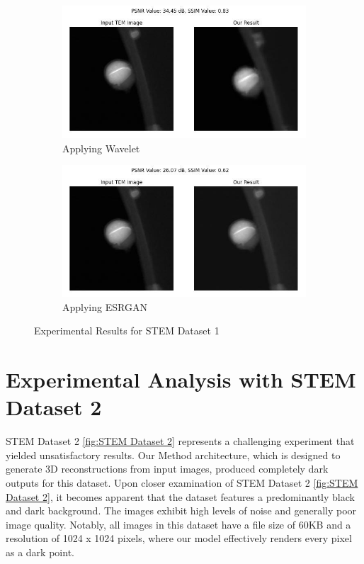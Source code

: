 \begin{figure}[H]
    \begin{subfigure}{.47\textwidth} %
        \includegraphics[width=\textwidth]{img/Results/STEM dataset 1/STEM_Data_1_wavelet.jpg}
        \caption{Applying Wavelet}
        \label{fig:STEM_Dataset_1_Results_Image5}
    \end{subfigure}
    \hfill
    \begin{subfigure}{.47\textwidth} %
        \includegraphics[width=\textwidth]{img/Results/STEM dataset 1/STEM_Data_1_ESRGAN.jpg}
        \caption{Applying ESRGAN}
        \label{fig:Image5}
    \end{subfigure}
    \caption{Experimental Results for STEM Dataset 1}
    \label{fig:STEM_Dataset_1_Results}
\end{figure}

\clearpage
\section{Experimental Analysis with STEM Dataset 2}
STEM Dataset 2 \ref{fig:STEM Dataset 2} represents a challenging experiment that yielded unsatisfactory results. Our Method architecture, which is designed to generate 3D reconstructions from input images, produced completely dark outputs for this dataset. Upon closer examination of STEM Dataset 2 \ref{fig:STEM Dataset 2}, it becomes apparent that the dataset features a predominantly black and dark background. The images exhibit high levels of noise and generally poor image quality. Notably, all images in this dataset have a file size of 60KB and a resolution of 1024 x 1024 pixels, where our model effectively renders every pixel as a dark point.

